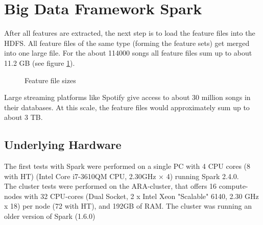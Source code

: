
\section{Big Data Framework Spark}\label{bds1}

After all features are extracted, the next step is to load the feature files into the HDFS.
All feature files of the same type (forming the feature sets) get merged into one large file. For the about 114000 songs all feature files sum up to about 11.2 GB (see figure \ref{filesize}). 

\begin{figure}[htbp]
	\centering
	\caption{Feature file sizes}
	\label{filesize}
\end{figure}

\noindent Large streaming platforms like Spotify give access to about 30 million songs in their databases. At this scale, the feature files would approximately sum up to about 3 TB.\\

\subsection{Underlying Hardware}

The first tests with Spark were performed on a single PC with 4 CPU cores (8 with HT) (Intel Core i7-3610QM CPU, 2.30GHz × 4) running Spark 2.4.0.\\ The cluster tests were performed on the ARA-cluster, that offers 16 compute-nodes with 32 CPU-cores (Dual Socket, 2 x Intel Xeon "Scalable" 6140, 2.30 GHz x 18) per node (72 with HT), and 192GB of RAM. The cluster was running an older version of Spark (1.6.0)\\

